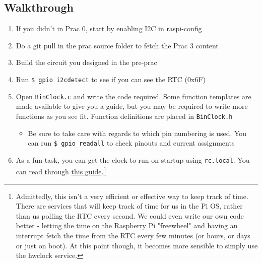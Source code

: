 \subsection{Walkthrough}
\begin{enumerate}
    \item If you didn't in Prac 0, start by enabling I2C in raspi-config
    \item Do a git pull in the prac source folder to fetch the Prac 3 content
    \item Build the circuit you designed in the pre-prac
    \item Run \verb|$ gpio i2cdetect| to see if you can see the RTC (0x6F)
    \item Open \verb|BinClock.c| and write the code required. Some function templates are made available to give you a guide, but you may be required to write more functions as you see fit. Function definitions are placed in \verb|BinClock.h|
    \begin{itemize}
        \item Be sure to take care with regards to which pin numbering is used. You can run \verb|$ gpio readall| to check pinouts and current assignments
    \end{itemize}
    \item As a fun task, you can get the clock to run on startup using \verb|rc.local|. You can read through \href{https://www.raspberrypi.org/documentation/linux/usage/rc-local.md}{this guide}.\footnote{Admittedly, this isn't a very efficient or effective way to keep track of time. There are services that will keep track of time for us in the Pi OS, rather than us polling the RTC every second. We could even write our own code better - letting the time on the Raspberry Pi "freewheel" and having an interrupt fetch the time from the RTC every few minutes (or hours, or days or just on boot). At this point though, it becomes more sensible to simply use the hwclock service.}
\end{enumerate}


